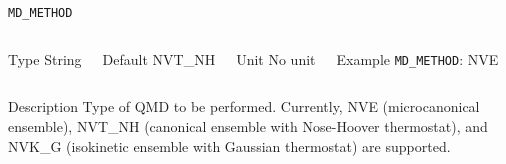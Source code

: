 \begin{frame}[allowframebreaks]{\texttt{MD\_METHOD}} \label{MD_METHOD}
\vspace*{-12pt}
\begin{columns}
\begin{block}{Type}
String
\end{block}

\begin{block}{Default}
NVT\_NH
\end{block}

\begin{block}{Unit}
No unit
\end{block}

\begin{block}{Example}
\texttt{MD\_METHOD}: NVE
\end{block}
\end{columns}

\begin{block}{Description}
Type of QMD to be performed. Currently, NVE (microcanonical ensemble), NVT\_NH (canonical ensemble with Nose-Hoover thermostat), and NVK\_G (isokinetic ensemble with Gaussian thermostat) are supported.
\end{block}

\end{frame}



